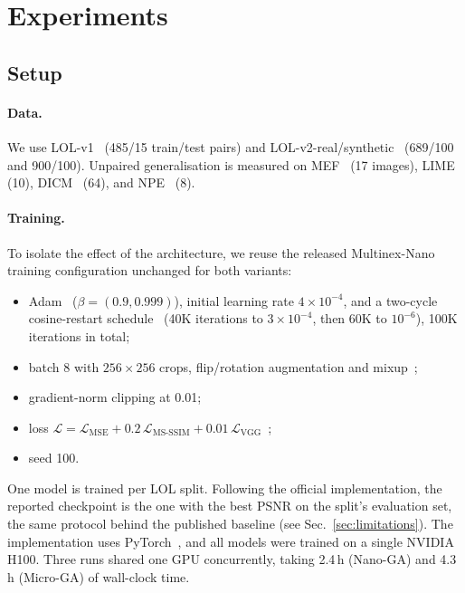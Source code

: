 \documentclass[10pt,twocolumn,letterpaper]{article}
\begin{document}
\section{Experiments}
\subsection{Setup}
\paragraph{Data.}
We use LOL-v1~\cite{wei2018retinexnet} (485/15 train/test pairs) and
LOL-v2-real/synthetic~\cite{yang2021lolv2} (689/100 and 900/100). Unpaired
generalisation is measured on MEF~\cite{ma2015mef} (17 images),
LIME~\cite{guo2017lime} (10), DICM~\cite{lee2013dicm} (64), and
NPE~\cite{wang2013npe} (8).

\paragraph{Training.}
To isolate the effect of the architecture, we reuse the released Multinex-Nano
training configuration unchanged for both variants:
\begin{itemize}
  \item Adam~\cite{kingma2015adam} ($\beta{=}(0.9,0.999)$), initial learning rate
  $4{\times}10^{-4}$, and a two-cycle cosine-restart schedule~\cite{loshchilov2017sgdr}
  (40K iterations to $3{\times}10^{-4}$, then 60K to $10^{-6}$), 100K iterations in
  total;
  \item batch 8 with $256{\times}256$ crops, flip/rotation augmentation and
  mixup~\cite{zhang2018mixup};
  \item gradient-norm clipping at 0.01;
  \item loss $\mathcal{L}=\mathcal{L}_{\mathrm{MSE}}+0.2\,\mathcal{L}_{\mathrm{MS\text{-}SSIM}}+0.01\,\mathcal{L}_{\mathrm{VGG}}$~\cite{wang2003msssim,simonyan2015vgg};
  \item seed 100.
\end{itemize}
One model is trained per LOL split. Following the official implementation, the
reported checkpoint is the one with the best PSNR on the split's evaluation set,
the same protocol behind the published baseline (see
Sec.~\ref{sec:limitations}). The implementation uses PyTorch~\cite{paszke2019pytorch}, and all models were
trained on a single NVIDIA H100.
Three runs shared one GPU concurrently, taking 2.4\,h (Nano-GA) and 4.3\,h
(Micro-GA) of wall-clock time.
\end{document}
